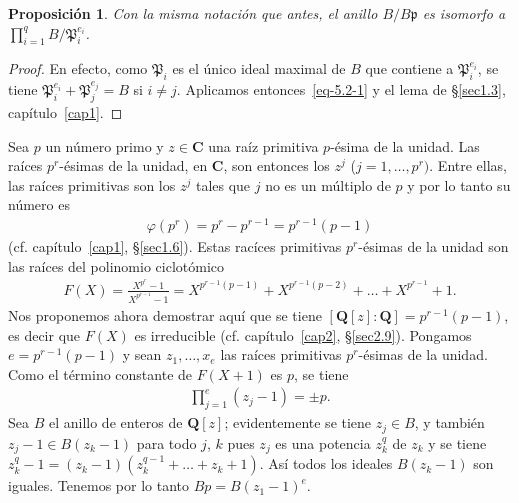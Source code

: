 \documentclass[10pt,oneside,bibtotoc,smallheadings,leqno,a5paper,DIV=12]{scrbook}
\newcommand{\QQ}{\mathbf{Q}}
\newcommand{\CC}{\mathbf{C}}
\newcommand{\idl}[1]{\mathfrak{#1}}
\numberwithin{equation}{section}
\theoremstyle{defi}
\theoremstyle{enonce}
\newtheorem{proposition}{Proposici\'on}
\theoremstyle{rem}
\numberwithin{theorem}{section}
\numberwithin{proposition}{section}
\numberwithin{definition}{section}
\numberwithin{lemma}{section}
\numberwithin{corollary}{section}
\numberwithin{example}{section}
\numberwithin{footnote}{section}%
\begin{document}
\begin{proposition}\label{prop5.2.2}
Con la misma notaci\'on que antes, el anillo $B/B\idl{p}$ es isomorfo a $\prod_{i=1}^{q}B/\idl{P}_{i}^{e_{i}}$.
\end{proposition}

\begin{proof}
En efecto, como $\idl{P}_{i}$ es el \'unico ideal maximal de $B$ que contiene a $\idl{P}_{i}^{e_{i}}$, se tiene
$\idl{P}_{i}^{e_{i}}+\idl{P}_{j}^{e_{j}}=B$ si $i\neq j$. Aplicamos entonces~\eqref{eq-5.2-1} y el
lema de \S\ref{sec1.3}, cap\'itulo~\ref{cap1}.
\end{proof}


Sea $p$ un n\'umero primo y $z\in\CC$ una ra\'iz primitiva $p$-\'esima de la unidad. Las ra\'ices $p^{r}$-\'esimas
de la unidad, en $\CC$, son entonces los $z^{j}$ ($j=1,\dots,p^{r})$. Entre ellas, las ra\'ices primitivas son los
$z^{j}$ tales que $j$ no es un m\'ultiplo de $p$ y por lo tanto su n\'umero es
\begin{gather*}
\varphi(p^{r}) = p^{r}-p^{r-1}=p^{r-1}(p-1)
\end{gather*}
(cf. cap\'itulo~\ref{cap1}, \S\ref{sec1.6}). Estas rac\'ices primitivas $p^{r}$-\'esimas de la unidad son las ra\'ices del
polinomio ciclot\'omico
\begin{gather}\label{eq-5.2-3}
F(X) = \frac{X^{p^{r}}-1}{X^{p^{r-1}}-1} = X^{p^{r-1}(p-1)}+X^{p^{r-1}(p-2)}+\dots+X^{p^{r-1}}+1.
\end{gather}
Nos proponemos ahora demostrar aqu\'i que se tiene $[\QQ[z]:\QQ] = p^{r-1}(p-1)$, es decir que $F(X)$ es irreducible
(cf. cap\'itulo~\ref{cap2}, \S\ref{sec2.9}). Pongamos $e=p^{r-1}(p-1)$ y sean $z_{1},\dots,x_{e}$ las ra\'ices primitivas
$p^{r}$-\'esimas de la unidad. Como el t\'ermino constante de $F(X+1)$ es $p$, se tiene
\begin{gather*}
\prod_{j=1}^{e}(z_{j}-1) = \pm p.
\end{gather*}
Sea $B$ el anillo de enteros de $\QQ[z]$; evidentemente se tiene $z_{j}\in B$, y tambi\'en $z_{j}-1\in B(z_{k}-1)$
para todo $j$, $k$ pues $z_{j}$ es una potencia $z_{k}^{q}$ de $z_{k}$ y se tiene $z_{k}^{q}-1=(z_{k}-1)(z_{k}^{q-1}+
\dots+z_{k}+1)$. As\'i todos los ideales $B(z_{k}-1)$ son iguales. Tenemos por lo tanto $Bp = B(z_{1}-1)^{e}$.
\end{document}
